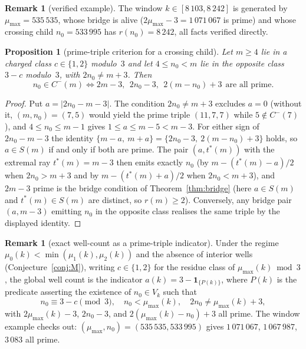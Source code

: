 \documentclass[11pt]{article}
\theoremstyle{plain}
\newtheorem{proposition}[theorem]{Proposition}
\theoremstyle{definition}
\newtheorem{remark}[theorem]{Remark}
\newcommand{\rays}{S}
\newcommand{\rch}{r}
\newcommand{\Vk}{V_{k}}
\newcommand{\tstar}{t^{\ast}}
\begin{document}
\begin{remark}[verified example]\label{rem:ex8103}
The window $k \in [8\,103, 8\,242]$ is generated by
$\mu_{\max} = 535\,535$, whose bridge is alive
($2\mu_{\max} - 3 = 1\,071\,067$ is prime) and whose crossing child
$n_0 = 533\,995$ has $\rch(n_0) = 8\,242$, all facts verified
directly.
\end{remark}

\begin{proposition}[prime-triple criterion for a crossing child]
\label{prop:triple}
Let $m \ge 4$ lie in a charged class $c \in \{1,2\}$ modulo~$3$ and
let $4 \le n_0 < m$ lie in the opposite class $3 - c$ modulo~$3$,
with $2n_0 \neq m + 3$. Then
\[
n_0 \in C^{-}(m) \iff 2m - 3,\ \ 2n_0 - 3,\ \ 2(m - n_0) + 3
\ \ \text{are all prime}.
\]
\end{proposition}

\begin{proof}
Put $a = |2n_0 - m - 3|$. The condition $2n_0 \neq m + 3$ excludes
$a = 0$ (without it, $(m,n_0) = (7,5)$ would yield the prime
triple $(11,7,7)$ while $5 \notin C^{-}(7)$), and
$4 \le n_0 \le m - 1$ gives $1 \le a \le m - 5 < m - 3$. For
either sign of $2n_0 - m - 3$ the identity
$\{m - a,\ m + a\} = \{2n_0 - 3,\ 2(m - n_0) + 3\}$ holds, so
$a \in \rays(m)$ if and only if both are prime. The pair
$(a, \tstar(m))$ with the extremal ray $\tstar(m) = m - 3$ then
emits exactly $n_0$ (by $m - (\tstar(m) - a)/2$ when
$2n_0 > m + 3$ and by $m - (\tstar(m) + a)/2$ when
$2n_0 < m + 3$), and $2m - 3$ prime is the bridge condition of
Theorem~\ref{thm:bridge} (here $a \in \rays(m)$ and
$\tstar(m) \in \rays(m)$ are distinct, so $\rch(m) \ge 2$).
Conversely, any bridge pair $(a, m - 3)$ emitting $n_0$ in the
opposite class realises the same triple by the displayed identity.
\end{proof}

\begin{remark}[exact well-count as a prime-triple indicator]
\label{rem:exact}
Under the regime $\mu_0(k) < \min(\mu_1(k),\mu_2(k))$ and the
absence of interior wells (Conjecture~\ref{conj:M}), writing
$c \in \{1,2\}$ for the residue class of $\mu_{\max}(k) \bmod 3$,
the global well count is the indicator
$a(k) = 3 - \mathbf{1}_{\{P(k)\}}$, where $P(k)$ is the predicate
asserting the existence of $n_0 \in \Vk$ such that
\[
n_0 \equiv 3 - c \pmod 3,\quad
n_0 < \mu_{\max}(k),\quad
2n_0 \neq \mu_{\max}(k) + 3,
\]
with $2\mu_{\max}(k)-3$, $2n_0-3$, and $2(\mu_{\max}(k)-n_0)+3$ all
prime. The window example checks out:
$(\mu_{\max},n_0) = (535\,535, 533\,995)$ gives $1\,071\,067$,
$1\,067\,987$, $3\,083$ all prime.
\end{remark}
\end{document}
